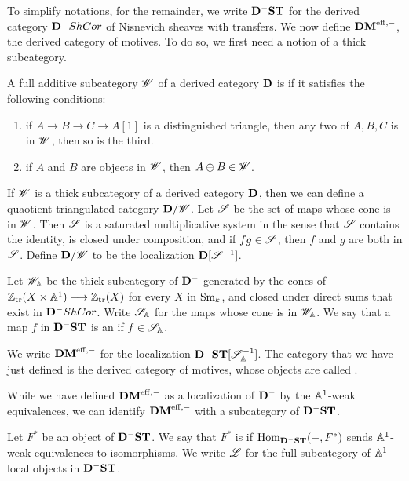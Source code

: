 To simplify notations, for the remainder, we write $\DShCor$ for 
the derived category $\DCat^-\ShCor$ of Nisnevich sheaves with 
transfers. We now define $\DMeff$, the derived category of 
motives. To do so, we first need a notion of a thick subcategory.

\begin{defn}
A full additive subcategory $\Cat{W}$ of a derived category 
$\DCat$ is  if it satisfies the following conditions:
\begin{enumerate}
\item if $A \to B \to C \to A[1]$ is a distinguished triangle, then
any two of $A, B, C$ is in $\Cat{W}$, then so is the third.

\item if $A$ and $B$ are objects in $\Cat{W}$, then $A \oplus B \in
\Cat{W}$.
\end{enumerate}
\end{defn}

If $\Cat{W}$ is a thick subcategory of a derived category $\DCat$,
then we can define a quaotient triangulated category 
$\DCat/\Cat{W}$. Let $\Cat{S}$ be the set of maps whose cone is in 
$\Cat{W}$. Then $\Cat{S}$ is a saturated multiplicative system in 
the sense that $\Cat{S}$ contains the identity, is closed under 
composition, and if $fg \in \Cat{S}$, then $f$ and $g$ are both in 
$\Cat{S}$. Define $\DCat/\Cat{W}$ to be the localization 
$\DCat[D] [\Cat{S}^{-1}]$.

\begin{defn}\label{def_DMeff}
Let $\Cat{W}_{\A}$ be the thick subcategory of $\DCat^-$ generated 
by the cones of $\Ztr(X \times \A^1) \to \Ztr(X)$ for every $X$ in 
$\Sm$, and closed under direct sums that exist in $\DCat^-\ShCor$. 
Write $\Cat{S}_{\A}$ for the maps whose cone is in $\Cat{W}_{\A}$. 
We say that a map $f$ in $\DShCor$ is an  if $f \in \Cat{S}_{\A}$.

We write $\DMeff$ for the localization 
$\DShCor [\Cat{S}_{\A}^{-1}]$. The category that we have
just defined is the derived category of motives, whose objects are
called .
\end{defn}

While we have defined $\DMeff$ as a localization of 
$\DCat^-$ by the $\A^1$-weak equivalences, we can identify
$\DMeff$ with a subcategory of $\DShCor$.

\begin{defn}\label{def_ALocal}
Let $F^*$ be an object of $\DShCor$. We say that $F^*$ is 
 if $\hom_{\DShCor}(-, F^*)$ sends $\A^1$-weak 
equivalences to isomorphisms. We write $\ALocal$ for the full 
subcategory of $\A^1$-local objects in $\DShCor$.
\end{defn}

